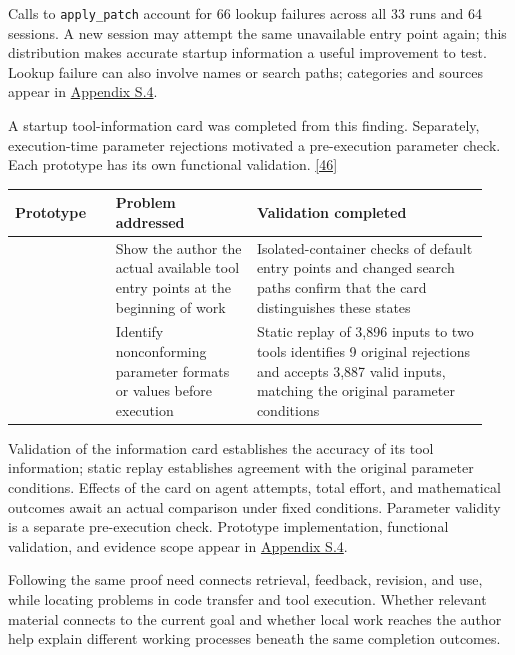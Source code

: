 Calls to \nolinkurl{apply_patch} account for 66 lookup failures across all 33 runs and 64 sessions. A new session may attempt the same unavailable entry point again; this distribution makes accurate startup information a useful improvement to test. Lookup failure can also involve names or search paths; categories and sources appear in \href{en-appendix.pdf\#s4}{Appendix S.4}.

A startup tool-information card was completed from this finding. Separately, execution-time parameter rejections motivated a pre-execution parameter check. Each prototype has its own functional validation. \hyperlink{ref-46}{\mbox{[46]}}

\begingroup\small\setlength{\tabcolsep}{3pt}\renewcommand{\arraystretch}{1.14}
\par\nopagebreak\medskip\noindent\begin{minipage}[t]{\linewidth}
\begin{tabular}{>{\raggedright\arraybackslash}p{0.2\linewidth}>{\raggedright\arraybackslash}p{0.28\linewidth}>{\raggedright\arraybackslash}p{0.46\linewidth}}
\toprule
\textbf{Prototype} & \textbf{Problem addressed} & \textbf{Validation completed}\\\midrule

{Startup tool-information card} & {Show the author the actual available tool entry points at the beginning of work} & {Isolated-container checks of default entry points and changed search paths confirm that the card distinguishes these states}\\
{Parameter preflight} & {Identify nonconforming parameter formats or values before execution} & {Static replay of 3,896 inputs to two tools identifies 9 original rejections and accepts 3,887 valid inputs, matching the original parameter conditions}\\
\bottomrule\end{tabular}\end{minipage}\par\medskip\endgroup
Validation of the information card establishes the accuracy of its tool information; static replay establishes agreement with the original parameter conditions. Effects of the card on agent attempts, total effort, and mathematical outcomes await an actual comparison under fixed conditions. Parameter validity is a separate pre-execution check. Prototype implementation, functional validation, and evidence scope appear in \href{en-appendix.pdf\#s4}{Appendix S.4}.

Following the same proof need connects retrieval, feedback, revision, and use, while locating problems in code transfer and tool execution. Whether relevant material connects to the current goal and whether local work reaches the author help explain different working processes beneath the same completion outcomes.


